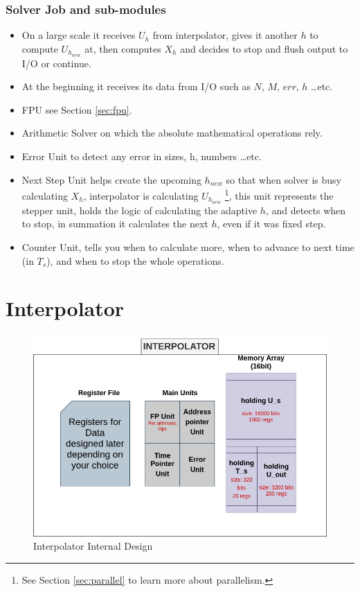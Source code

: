 \documentclass[12pt]{report}
\begin{document}
\subsubsection{Solver Job and sub-modules}
\begin{itemize}
    \item On a large scale it receives $U_h$ from interpolator, gives it another $h$ to compute $U_{h_{new}}$ at, then computes $X_h$ and decides to stop and flush output to I/O or continue.
    \item At the beginning it receives its data from I/O such as $N$, $M$, $err$, $h$ \dots etc.
    \item {FPU} see Section \ref{sec:fpu}.
    \item {Arithmetic Solver} on which the absolute mathematical operations rely.
    \item {Error Unit} to detect any error in sizes, h, numbers \dots etc.
    \item {Next Step Unit} helps create the upcoming $h_{new}$ so that when solver is busy calculating $X_h$, interpolator is calculating $U_{h_{new}}$ \footnote{See Section \ref{sec:parallel} to learn more about parallelism.}, this unit represents the stepper unit, holds the logic of calculating the adaptive $h$, and detects when to stop, in summation it calculates the next $h$, even if it was fixed step.
    \item {Counter Unit}, tells you when to calculate more, when to advance to next time (in $T_s$), and when to stop the whole operations.
\end{itemize}

\section{Interpolator}

\begin{figure}[hp]
    \centering
    \includegraphics[width=\textwidth]{interpolator}
    \caption{Interpolator Internal Design}
    \label{fig:interpolator}
\end{figure}
\end{document}
